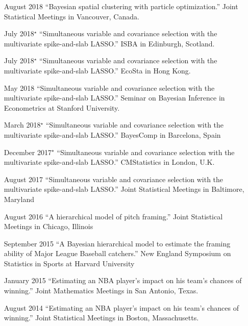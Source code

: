 \documentclass[margin]{res}
\begin{document}
\begin{resume}
\begin{itemize}
\item[August 2018]{``Bayesian spatial clustering with particle optimization.'' Joint Statistical Meetings in Vancouver, Canada.}

\item[July 2018$^{\star}$]{``Simultaneous variable and covariance selection with the multivariate spike-and-slab LASSO.'' ISBA in Edinburgh, Scotland.}

\item[July 2018$^{\star}$]{``Simultaneous variable and covariance selection with the multivariate spike-and-slab LASSO.'' EcoSta in Hong Kong.}

\item[May 2018]{``Simultaneous variable and covariance selection with the multivariate spike-and-slab LASSO.'' Seminar on Bayesian Inference in Econometrics at Stanford University.}

\item[March 2018$^{\star}$]{``Simultaneous variable and covariance selection with the multivariate spike-and-slab LASSO.'' BayesComp in Barcelona, Spain}

\item[December 2017$^{\star}$]{``Simultaneous variable and covariance selection with the multivariate spike-and-slab LASSO.'' CMStatistics in London, U.K.}

\item[August 2017]{``Simultaneous variable and covariance selection with the multivariate spike-and-slab LASSO.'' Joint Statistical Meetings in Baltimore, Maryland}

\item[August 2016]{``A hierarchical model of pitch framing.'' Joint Statistical Meetings in Chicago, Illinois}

\item[September 2015]{``A Bayesian hierarchical model to estimate the framing ability of Major League Baseball catchers.'' New England Symposium on Statistics in Sports at Harvard University}

\item[January 2015]{``Estimating an NBA player's impact on his team's chances of winning.'' Joint Mathematics Meetings in San Antonio, Texas.}

\item[August 2014]{``Estimating an NBA player's impact on his team's chances of winning.'' Joint Statistical Meetings in Boston, Massachusetts.}

\end{itemize}


\end{resume}
\end{document}

